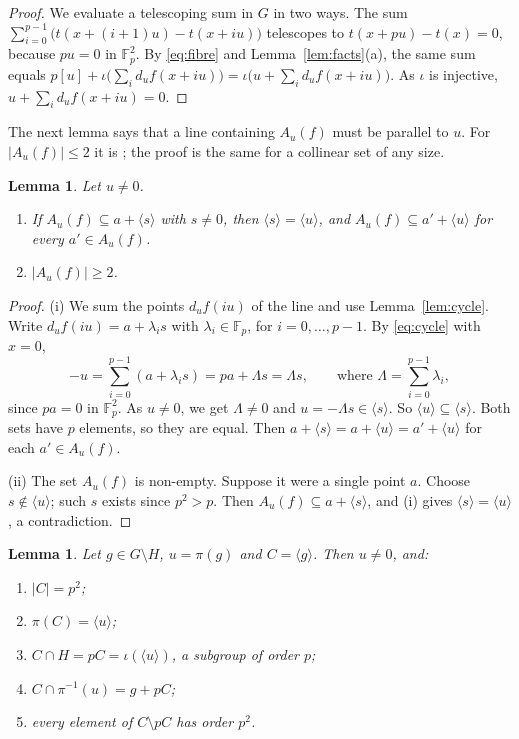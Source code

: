 \documentclass[11pt]{amsart}
\newtheorem{lemma}[theorem]{Lemma}
\theoremstyle{definition}\newtheorem{definition}[theorem]{Definition}
\theoremstyle{remark}\newtheorem{remark}[theorem]{Remark}
\newcommand{\F}{\mathbb{F}}
\newcommand{\abs}[1]{\lvert #1\rvert}
\newcommand{\gen}[1]{\langle #1\rangle}
\begin{document}
\begin{proof}
We evaluate a telescoping sum in \(G\) in two ways.
The sum \(\sum_{i=0}^{p-1}\bigl(t(x+(i+1)u)-t(x+iu)\bigr)\) telescopes to \(t(x+pu)-t(x)=0\), because \(pu=0\) in \(\F_p^2\).
By \eqref{eq:fibre} and Lemma~\ref{lem:facts}(a), the same sum equals \(p[u]+\iota\bigl(\sum_id_uf(x+iu)\bigr)=\iota\bigl(u+\sum_id_uf(x+iu)\bigr)\).
As \(\iota\) is injective, \(u+\sum_id_uf(x+iu)=0\).
\end{proof}

The next lemma says that a line containing \(A_u(f)\) must be parallel to \(u\).
For \(\abs{A_u(f)}\le2\) it is \cite[Lemma~6.3(1)--(2)]{BPT}; the proof is the same for a collinear set of any size.

\begin{lemma}\label{lem:parallel}
Let \(u\ne0\).
\begin{enumerate}
\item[(i)] If \(A_u(f)\subseteq a+\gen{s}\) with \(s\ne0\), then \(\gen{s}=\gen{u}\), and \(A_u(f)\subseteq a'+\gen{u}\) for every \(a'\in A_u(f)\).
\item[(ii)] \(\abs{A_u(f)}\ge2\).
\end{enumerate}
\end{lemma}

\begin{proof}
(i) We sum the points \(d_uf(iu)\) of the line and use Lemma~\ref{lem:cycle}.
Write \(d_uf(iu)=a+\lambda_is\) with \(\lambda_i\in\F_p\), for \(i=0,\dots,p-1\).
By \eqref{eq:cycle} with \(x=0\),
\[
-u=\sum_{i=0}^{p-1}(a+\lambda_is)=pa+\Lambda s=\Lambda s,\qquad\text{where } \Lambda=\sum_{i=0}^{p-1}\lambda_i ,
\]
since \(pa=0\) in \(\F_p^2\).
As \(u\ne0\), we get \(\Lambda\ne0\) and \(u=-\Lambda s\in\gen{s}\).
So \(\gen{u}\subseteq\gen{s}\).
Both sets have \(p\) elements, so they are equal.
Then \(a+\gen{s}=a+\gen{u}=a'+\gen{u}\) for each \(a'\in A_u(f)\).

(ii) The set \(A_u(f)\) is non-empty.
Suppose it were a single point \(a\).
Choose \(s\notin\gen{u}\); such \(s\) exists since \(p^2>p\).
Then \(A_u(f)\subseteq a+\gen{s}\), and (i) gives \(\gen{s}=\gen{u}\), a contradiction.
\end{proof}

\begin{lemma}\label{lem:cyclic}
Let \(g\in G\setminus H\), \(u=\pi(g)\) and \(C=\gen{g}\). Then \(u\ne0\), and:
\begin{enumerate}
\item[(i)] \(\abs{C}=p^2\);
\item[(ii)] \(\pi(C)=\gen{u}\);
\item[(iii)] \(C\cap H=pC=\iota(\gen{u})\), a subgroup of order \(p\);
\item[(iv)] \(C\cap\pi^{-1}(u)=g+pC\);
\item[(v)] every element of \(C\setminus pC\) has order \(p^2\).
\end{enumerate}
\end{lemma}
\end{document}
